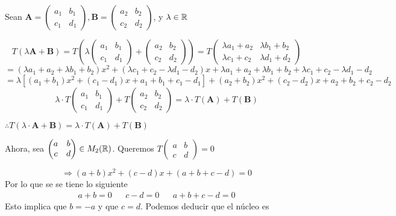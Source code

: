 \begin{proofexplanation}
    Sean $\textbf{A} = \begin{pmatrix} a_1 & b_1 \\ c_1 & d_1 \end{pmatrix}, \textbf{B} = \begin{pmatrix} a_2 & b_2 \\ c_2 & d_2 \end{pmatrix}$, y $\lambda \in \mathbb{R}$

    $$T(\lambda \textbf{A} + \textbf{B}) = T \left( \lambda \begin{pmatrix} a_1 & b_1 \\ c_1 & d_1 \end{pmatrix} + \begin{pmatrix} a_2 & b_2 \\ c_2 & d_2 \end{pmatrix}\right) = T \begin{pmatrix} \lambda a_1 + a_2 & \lambda b_1 + b_2 \\ \lambda c_1 + c_2 & \lambda d_1 + d_2 \end{pmatrix}$$
    $$=(\lambda a_1 + a_2 + \lambda b_1 + b_2)x^2 + (\lambda c_1 + c_2 - \lambda d_1 - d_2)x + \lambda a_1 + a_2 + \lambda b_1 + b_2 + \lambda c_1 + c_2 - \lambda d_1 - d_2$$
    $$= \lambda \left[ (a_1+b_1)x^2 + (c_1-d_1)x +a_1+b_1 +c_1 - d_1 \right] + (a_2+b_2)x^2 + (c_2-d_2)x + a_2 + b_2 +c_2-d_2$$
    $$\lambda \cdot T \begin{pmatrix} a_1 & b_1 \\ c_1 & d_1 \end{pmatrix} + T \begin{pmatrix} a_2 & b_2 \\ c_2 & d_2 \end{pmatrix} = \lambda \cdot T(\textbf{A}) + T(\textbf{B})$$

    $\therefore T(\lambda \cdot \textbf{A} + \textbf{B}) = \lambda \cdot T(\textbf{A}) + T(\textbf{B})$

    Ahora, sea $\begin{pmatrix} a & b \\ c & d \end{pmatrix} \in M_2(\mathbb{R})$. Queremos $T \begin{pmatrix} a & b \\ c & d \end{pmatrix} = 0$

    $$\Rightarrow (a+b)x^2 + (c-d)x + (a+b+c-d) = 0$$
    Por lo que se se tiene lo siguiente
    \begin{align*}
       a+b = 0 & & c-d = 0 & & a + b + c -d = 0 
    \end{align*}
    Esto implica que $b = -a$ y que $c = d$. Podemos deducir que el núcleo es


\end{proofexplanation}
